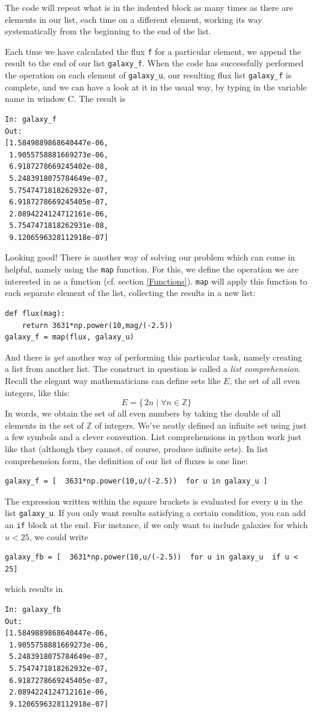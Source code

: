 \documentclass[twocolumn,apj]{openjournal}
\begin{document}
The code will repeat what is in the indented block as many times as there are elements in our list, each time on a different element, working its way systematically from the beginning to the end of the list. 

Each time we have calculated the flux \verb|f| for a particular element, we append the result to the end of our list \verb|galaxy_f|. When the code has successfully performed the operation on each element of \verb|galaxy_u|, our resulting flux list \verb|galaxy_f| is complete, and we can have a look at it in the usual way, by typing in the variable name in window C. The result is
\begin{lstlisting}
In: galaxy_f
Out: 
[1.5849889868640447e-06,
 1.9055758881669273e-06,
 6.9187278669245402e-08,
 5.2483918075784649e-07,
 5.7547471818262932e-07,
 6.9187278669245405e-07,
 2.0894224124712161e-06,
 5.7547471818262931e-08,
 9.1206596328112918e-07]
\end{lstlisting}
Looking good! There is another way of solving our problem which can come in helpful, namely using the \verb|map| function. For this, we define the operation we are interested in as a function (cf. section \ref{Functions}). \verb|map| will apply this function to each separate element of the list, collecting the results in a new list: \label{MapFunction}
\begin{lstlisting}
def flux(mag):
	return 3631*np.power(10,mag/(-2.5))
galaxy_f = map(flux, galaxy_u)
\end{lstlisting}
And there is {\em yet} another way of performing this particular task, namely creating a list from another list. The construct in question is called a {\em list comprehension}. Recall the elegant way mathematicians can define sets like $E$, the set of all even integers, like this:
$$
E = \{  \,2n\; |\; \forall n\in \mathbb{Z} \}
$$
In words, we obtain the set of all even numbers by taking the double of all elements in the set of $\mathbb{Z}$ of integers. We've neatly defined an infinite set using just a few symbols and a clever convention. List comprehensions in python work just like that (although they cannot, of course, produce infinite sets). In list comprehension form, the definition of our list of fluxes is one line:
\begin{lstlisting}
galaxy_f = [  3631*np.power(10,u/(-2.5))  for u in galaxy_u ]
\end{lstlisting}
The expression written within the square brackets is evaluated for every \verb|u| in the list \verb|galaxy_u|. If you only want results satisfying a certain condition, you can add an \verb|if| block at the end. For instance, if we only want to include galaxies for which
$u < 25$, we could write
\begin{lstlisting}
galaxy_fb = [  3631*np.power(10,u/(-2.5))  for u in galaxy_u  if u < 25]
\end{lstlisting}
which results in 
\begin{lstlisting}
In: galaxy_fb
Out: 
[1.5849889868640447e-06,
 1.9055758881669273e-06,
 5.2483918075784649e-07,
 5.7547471818262932e-07,
 6.9187278669245405e-07,
 2.0894224124712161e-06,
 9.1206596328112918e-07]
\end{lstlisting}
\end{document}
